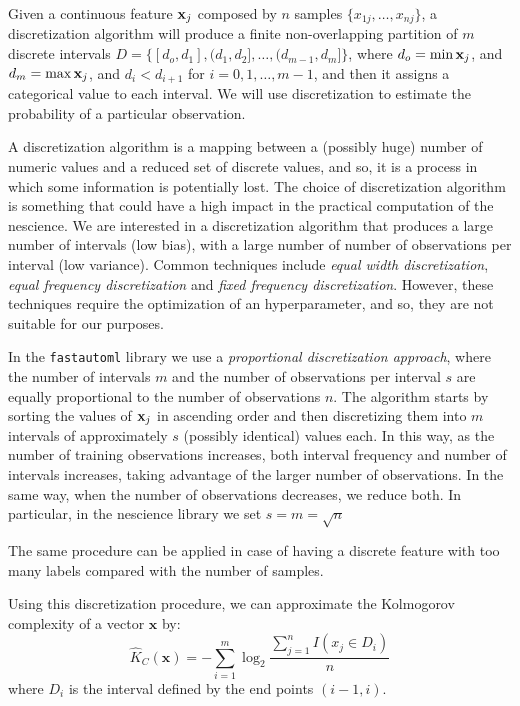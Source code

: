 Given a continuous feature $\bold{x}_j$ composed by $n$ samples $\{x_{1j}, \ldots, x_{nj}\}$, a discretization algorithm will produce a finite non-overlapping partition of $m$ discrete intervals $D=\{ [d_o, d_1], (d_1, d_2], \ldots, (d_{m-1}, d_m] \}$, where $d_o = \min{\bold{x}_j}$, and $d_m = \max{\bold{x}_j}$, and $d_i < d_{i+1}$ for $i = 0, 1, \ldots, m-1$, and then it assigns a categorical value to each interval. We will use discretization to estimate the probability of a particular observation.

A discretization algorithm is a mapping between a (possibly huge) number of numeric values and a reduced set of discrete values, and so, it is a process in which some information is potentially lost. The choice of discretization algorithm is something that could have a high impact in the practical computation of the nescience. We are interested in a discretization algorithm that produces a large number of intervals (low bias), with a large number of number of observations per interval (low variance). Common techniques include \emph{equal width discretization}, \emph{equal frequency discretization} and \emph{fixed frequency discretization}. However, these techniques require the optimization of an hyperparameter, and so, they are not suitable for our purposes.

In the \texttt{fastautoml} library we use a \emph{proportional discretization approach}, where the number of intervals $m$ and the number of observations per interval $s$ are equally proportional to the number of observations $n$. The algorithm starts by sorting the values of $\bold{x}_j$ in ascending order and then discretizing them into $m$ intervals of approximately $s$ (possibly identical) values each. In this way, as the number of training observations increases, both interval frequency and number of intervals increases, taking advantage of the larger number of observations. In the same way, when the number of observations decreases, we reduce both. In particular, in the nescience library we set $s = m = \sqrt{n}$

The same procedure can be applied in case of having a discrete feature with too many labels compared with the number of samples.

Using this discretization procedure, we can approximate the Kolmogorov complexity of a vector $\mathbf{x}$ by:
\[
\hat{K}_C(\mathbf{x}) = - \sum_{i=1}^m \log_2{ \frac{ \sum_{j=1}^n I(x_j \in D_i)} {n} } 
\]
where $D_i$ is the interval defined by the end points $(i-1, i)$.

